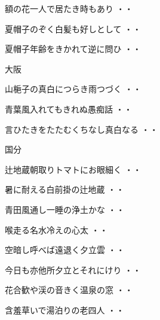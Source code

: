 \begin{shiika}額の花一人で居たき時もあり
\hfill{・・}\end{shiika}
\begin{shiika}夏帽子のぞく白髪も好しとして
\hfill{・・}\end{shiika}
\begin{shiika}夏帽子年齢をきかれて逆に問ひ
\hfill{・・}\end{shiika}
\vspace{0.6cm}
大阪
\begin{shiika}山梔子の真白につらき雨つづく
\hfill{・・}\end{shiika}
\begin{shiika}青葉風入れてもきれぬ愚痴話
\hfill{・・}\end{shiika}
\begin{shiika}言ひたきをたたむくちなし真白なる
\hfill{・・}\end{shiika}
\vspace{0.6cm}
国分
\begin{shiika}辻地蔵朝取りトマトにお眼細く
\hfill{・・}\end{shiika}
\begin{shiika}暑に耐える白前掛の辻地蔵
\hfill{・・}\end{shiika}
\begin{shiika}青田風通し一睡の浄土かな
\hfill{・・}\end{shiika}
\begin{shiika}喉走る名水冷えの心太
\hfill{・・}\end{shiika}
\begin{shiika}空暗し呼べば遠退く夕立雲
\hfill{・・}\end{shiika}
\begin{shiika}今日も亦他所夕立とそれにけり
\hfill{・・}\end{shiika}
\begin{shiika}花合歓や渓の音きく温泉の窓
\hfill{・・}\end{shiika}
\begin{shiika}含羞草いで湯泊りの老四人
\hfill{・・}\end{shiika}
